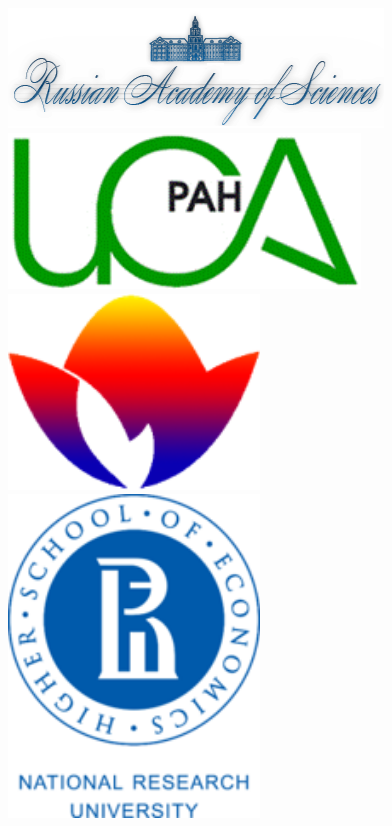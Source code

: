 \documentclass[default]{beamer}
\begin{document}
\begin{frame}
\begin{columns}
			\begin{column}{0.15\textwidth}
				\centering
				\includegraphics[width=\textwidth]{advert/ras_en.png}
				\vspace{7pt}
				\includegraphics[width=0.7\textwidth]{advert/isa.png}
				\vspace{7pt}
				\includegraphics[width=0.5\textwidth]{advert/raai.png}
				\vspace{7pt}
				\includegraphics[width=0.5\textwidth]{advert/hse.png}

\end{column}
\end{columns}
\end{frame}
\end{document}
